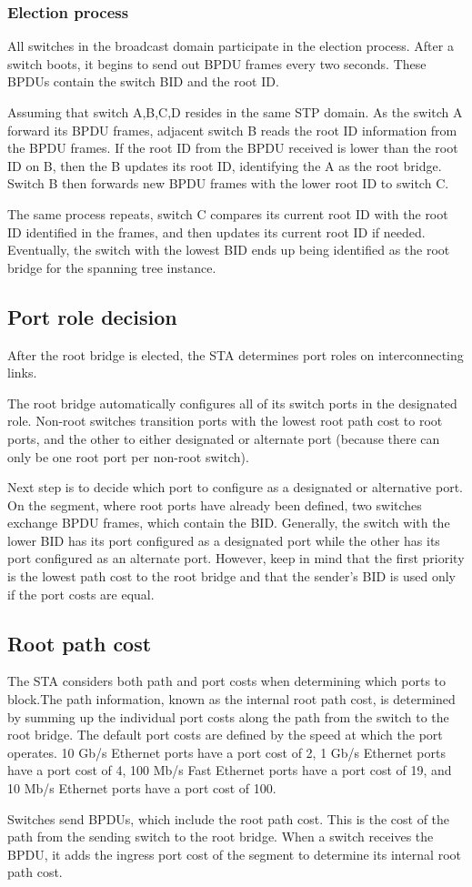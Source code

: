 \subsubsection{Election process}
All switches in the broadcast domain participate in the election process. After a switch boots, it begins to send out BPDU frames every two seconds. These BPDUs contain the switch BID and the root ID.\par 
Assuming that switch A,B,C,D resides in the same STP domain. As the switch A forward its BPDU frames, adjacent switch B reads the root ID information from the BPDU frames. If the root ID from the BPDU received is lower than the root ID on B, then the B updates its root ID, identifying the A as the root bridge. Switch B then forwards new BPDU frames with the lower root ID to switch C.\par 
The same process repeats, switch C compares its current root ID with the root ID identified in the frames, and then updates its current root ID if needed. Eventually, the switch with the lowest BID ends up being identified as the root bridge for the spanning tree instance.
\subsection{Port role decision}
After the root bridge is elected, the STA determines port roles on interconnecting links.\par 
The root bridge automatically configures all of its switch ports in the designated role. Non-root switches transition ports with the lowest root path cost to root ports, and the other to either  designated or alternate port (because there can only be one root port per non-root switch). \par 
Next step is to decide which port to configure as a designated or alternative port. On the segment, where root ports have already been defined, two switches exchange BPDU frames, which contain the BID. Generally, the switch with the lower BID has its port configured as a designated port while the other has its port configured as an alternate port. However, keep in mind that the first priority is the lowest path cost to the root bridge and that the sender’s BID is used only if the port costs are equal.
\subsection{Root path cost}
The STA considers both path and port costs when determining which ports to block.The path information, known as the internal root path cost, is determined by summing up the individual port costs along the path from the switch to the root bridge. The default port costs are defined by the speed at which the port operates. 10 Gb/s Ethernet ports have a port cost of 2, 1 Gb/s Ethernet ports have a port cost of 4, 100 Mb/s Fast Ethernet ports have a port cost of 19, and 10 Mb/s Ethernet ports have a port cost of 100.\par 
Switches send BPDUs, which include the root path cost. This is the cost of the path from the sending switch to the root bridge. When a switch receives the BPDU, it adds the ingress port cost of the segment to determine its internal root path cost.
